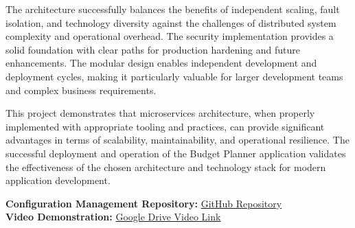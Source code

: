 \documentclass[conference]{IEEEtran}
\begin{document}
The architecture successfully balances the benefits of independent scaling, fault isolation, and technology diversity against the challenges of distributed system complexity and operational overhead. The security implementation provides a solid foundation with clear paths for production hardening and future enhancements. The modular design enables independent development and deployment cycles, making it particularly valuable for larger development teams and complex business requirements.

This project demonstrates that microservices architecture, when properly implemented with appropriate tooling and practices, can provide significant advantages in terms of scalability, maintainability, and operational resilience. The successful deployment and operation of the Budget Planner application validates the effectiveness of the chosen architecture and technology stack for modern application development.

\vspace{1mm}
\noindent\textbf{Configuration Management Repository: }
\href{https://github.com/md-d-cdr-4304/budget-planner}{GitHub Repository}\\
\noindent\textbf{Video Demonstration: }
\href{https://drive.google.com/drive/folders/1wueHDj2LGUJuBejR03_hyvfuyfl1XE6-?usp=sharing}{Google Drive Video Link}

\end{document}
